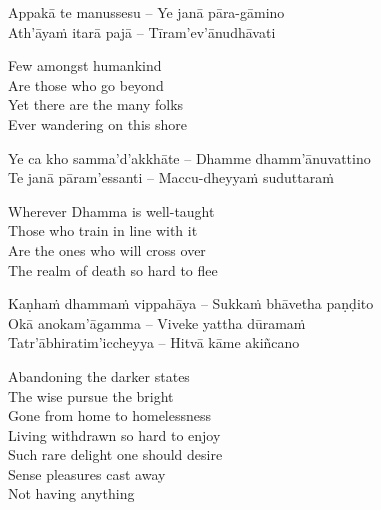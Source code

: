 \suttaRef{[Dhp 183-185]}

\begin{verses}
  Appakā te manussesu – Ye janā pāra-gāmino\\
  Ath'āyaṁ itarā pajā – Tīram'ev'ānudhāvati
\end{verses}

\begin{english-verses}
  Few amongst humankind\\
  Are those who go beyond\\
  Yet there are the many folks\\
  Ever wandering on this shore
\end{english-verses}

\begin{verses}
  Ye ca kho samma'd'akkhāte – Dhamme dhamm'ānuvattino\\
  Te janā pāram'essanti – Maccu-dheyyaṁ suduttaraṁ\\
\end{verses}

\begin{english-verses}
  Wherever Dhamma is well-taught\\
  Those who train in line with it\\
  Are the ones who will cross over\\
  The realm of death so hard to flee
\end{english-verses}

\begin{verses}
  Kaṇhaṁ dhammaṁ vippahāya – Sukkaṁ bhāvetha paṇḍito\\
  Okā anokam'āgamma – Viveke yattha dūramaṁ\\
  Tatr'ābhiratim'iccheyya – Hitvā kāme akiñcano
\end{verses}

\begin{english-verses}
  Abandoning the darker states\\
  The wise pursue the bright\\
  Gone from home to homelessness\makeatletter\hyperlink{endnote37-appendix}\makeatother\\
  Living withdrawn so hard to enjoy\makeatletter\hyperlink{endnote38-appendix}\makeatother\\
  Such rare delight one should desire\\
  Sense pleasures cast away\\
  Not having anything
\end{english-verses}

